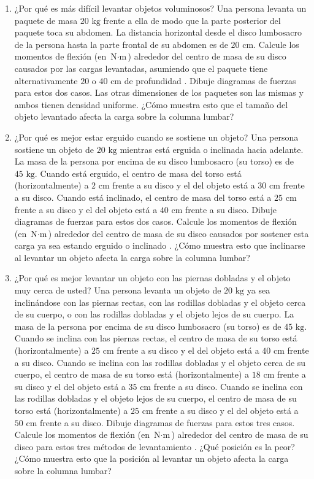 \documentclass[12pt]{book}
\begin{document}
\begin{enumerate}
\item[2.34] ¿Por qué es más difícil levantar objetos voluminosos? Una persona levanta un paquete de masa $20\text{ kg}$ frente a ella de modo que la parte posterior del paquete toca su abdomen. La distancia horizontal desde el disco lumbosacro de la persona hasta la parte frontal de su abdomen es de $20\text{ cm}$. Calcule los momentos de flexión (en $\text{N}\cdot\text{m}$) alrededor del centro de masa de su disco causados por las cargas levantadas, asumiendo que el paquete tiene alternativamente $20$ o $40\text{ cm}$ de profundidad \cite{25}. Dibuje diagramas de fuerzas para estos dos casos. Las otras dimensiones de los paquetes son las mismas y ambos tienen densidad uniforme. ¿Cómo muestra esto que el tamaño del objeto levantado afecta la carga sobre la columna lumbar?

\item[2.35] ¿Por qué es mejor estar erguido cuando se sostiene un objeto? Una persona sostiene un objeto de $20\text{ kg}$ mientras está erguida o inclinada hacia adelante. La masa de la persona por encima de su disco lumbosacro (su torso) es de $45\text{ kg}$. Cuando está erguido, el centro de masa del torso está (horizontalmente) a $2\text{ cm}$ frente a su disco y el del objeto está a $30\text{ cm}$ frente a su disco. Cuando está inclinado, el centro de masa del torso está a $25\text{ cm}$ frente a su disco y el del objeto está a $40\text{ cm}$ frente a su disco. Dibuje diagramas de fuerzas para estos dos casos. Calcule los momentos de flexión (en $\text{N}\cdot\text{m}$) alrededor del centro de masa de su disco causados por sostener esta carga ya sea estando erguido o inclinado \cite{25}. ¿Cómo muestra esto que inclinarse al levantar un objeto afecta la carga sobre la columna lumbar?

\item[2.36] ¿Por qué es mejor levantar un objeto con las piernas dobladas y el objeto muy cerca de usted? Una persona levanta un objeto de $20\text{ kg}$ ya sea inclinándose con las piernas rectas, con las rodillas dobladas y el objeto cerca de su cuerpo, o con las rodillas dobladas y el objeto lejos de su cuerpo. La masa de la persona por encima de su disco lumbosacro (su torso) es de $45\text{ kg}$. Cuando se inclina con las piernas rectas, el centro de masa de su torso está (horizontalmente) a $25\text{ cm}$ frente a su disco y el del objeto está a $40\text{ cm}$ frente a su disco. Cuando se inclina con las rodillas dobladas y el objeto cerca de su cuerpo, el centro de masa de su torso está (horizontalmente) a $18\text{ cm}$ frente a su disco y el del objeto está a $35\text{ cm}$ frente a su disco. Cuando se inclina con las rodillas dobladas y el objeto lejos de su cuerpo, el centro de masa de su torso está (horizontalmente) a $25\text{ cm}$ frente a su disco y el del objeto está a $50\text{ cm}$ frente a su disco. Dibuje diagramas de fuerzas para estos tres casos. Calcule los momentos de flexión (en $\text{N}\cdot\text{m}$) alrededor del centro de masa de su disco para estos tres métodos de levantamiento \cite{25}. ¿Qué posición es la peor? ¿Cómo muestra esto que la posición al levantar un objeto afecta la carga sobre la columna lumbar?


\end{enumerate}
\end{document}
